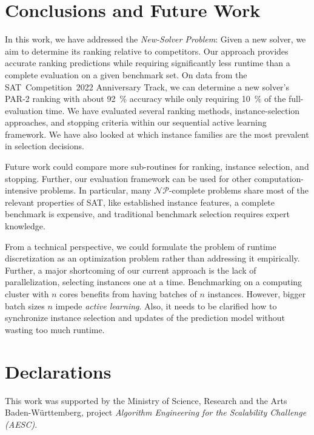 \documentclass[sn-basic, Numbered]{sn-jnl} %
\begin{document}
\section{Conclusions and Future Work}
\label{sec:conclusion}

In this work, we have addressed the \emph{New-Solver Problem}:
Given a new solver, we aim to determine its ranking relative to competitors.
Our approach provides accurate ranking predictions while requiring significantly less runtime than a complete evaluation on a given benchmark set.
On data from the SAT~Competition~2022 Anniversary Track, we can determine a new solver's PAR-2 ranking with about \SI{92}{\%} accuracy while only requiring \SI{10}{\%} of the full-evaluation time.
We have evaluated several ranking methods, instance-selection approaches, and stopping criteria within our sequential active learning framework.
We have also looked at which instance families are the most prevalent in selection decisions.

Future work could compare more sub-routines for ranking, instance selection, and stopping.
Further, our evaluation framework can be used for other computation-intensive problems.
In particular, many $\mathcal{NP}$-complete problems share most of the relevant properties of SAT, like established instance features, a complete benchmark is expensive, and traditional benchmark selection requires expert knowledge.

From a technical perspective, we could formulate the problem of runtime discretization as an optimization problem rather than addressing it empirically.
Further, a major shortcoming of our current approach is the lack of parallelization, selecting instances one at a time.
Benchmarking on a computing cluster with $n$ cores benefits from having batches of $n$ instances.
However, bigger batch sizes $n$ impede \emph{active learning}.
Also, it needs to be clarified how to synchronize instance selection and updates of the prediction model without wasting too much runtime.

\backmatter

\section*{Declarations}


This work was supported by the Ministry of Science, Research and the Arts Baden-Württemberg, project \emph{Algorithm Engineering for the Scalability Challenge (AESC)}.
\end{document}
